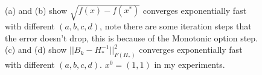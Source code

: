\documentclass[12pt,a4paper]{article}
\begin{document}
	\begin{figure}
		\centering
		\\
		
		
		\caption{  (a) and (b) show $\sqrt{f(x)-f(x^*)}$ converges exponentially fast with different $(a,b,c,d)$, note there are some iteration steps that the error doesn't drop, this is because of the Monotonic option step. (c) and (d) show $||B_k-H_*^{-1}||^2_{F(H_*)}$ converges exponentially fast with different $(a,b,c,d)$. $x^0=(1,1)$ in my experiments. } %
		\label{img1}
	\end{figure}
	
	
	
\end{document}
